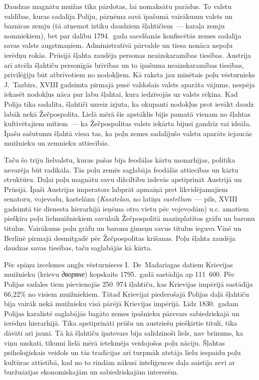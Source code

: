\documentclass[twoside,a5paper,12pt,fleqn,openany]{extbook}
\newcommand{\pltxti}[1]{\textit{\textpolish{#1}}}
\newcommand{\rutxti}[1]{\textit{\textrussian{#1}}}
\newcommand{\latxti}[1]{\textit{\textlatin{#1}}}
\begin{document}
Daudzas magnātu muižas tika pārdotas, lai nomaksātu parādus. To valstu valdības, kuras sadalīja Poliju, pārņēma savā īpašumā vairākumu valsts un baznīcas zemju (tā atņemot iztiku daudziem šļahtičiem~--- karaļa zemju nomniekiem), bet par dalību 1794.~gada sacelšanās konfiscētās zemes sadalīja savas valsts augstmaņiem. Administratīvā pārvalde un tiesa nonāca nepoļu ierēdņu rokās. Prūsijā šļahta zaudēja personas neaizskaramības tiesības. Austrija arī atcēla šļahtiču personīgās brīvības un to īpašuma neaizskaramības tiesības, privilēģiju būt atbrīvotiem no nodokļiem. Kā raksta jau minētais poļu vēsturnieks J.~Tazbirs, XVIII gadsimta pirmajā pusē valdošais valsts aparāta vājums, nespēja iekasēt nodokļus nāca par labu šļahtai, kura iedzīvojās uz valsts rēķina. Kad Polija tika sadalīta, šļahtiči uzreiz izjuta, ka okupanti nodokļus prot ievākt daudz labāk nekā Žečpospolita. Lielā mērā šis apstāklis bijis pamatā vienam no šļahtas kultivētajiem mītiem~--- ka Žečpospolitas valsts iekārta bijusi gandrīz vai ideāla. Īpašu sašutumu šļahtā viesa tas, ka poļu zemes sadalījušo valstu aparāts iejaucās muižnieku un zemnieku attiecībās.

Taču šo triju lielvalstu, kuras pašas bija feodālas kārtu monarhijas, politika nevarēja būt radikāla. Tās poļu zemēs saglabāja feodālās attiecības un kārtu struktūru. Daļai poļu magnātu savu dižciltību izdevās apstiprināt Austrijā un Prūsijā. Īpaši Austrijas imperators labprāt apmaiņā pret likvidējamajiem senatoru, vojevodu, kastelānu (\pltxti{Kasztelan}, no latīņu \latxti{castellum}~--- pils, XVIII gadsimtā tie dienesta hierarhijā ieņēma otro vietu pēc vojevodām) u.c. amatiem piešķīra poļu lielmuižniekiem savulaik Žečpospolitā mazizplatītos grāfu un baronu titulus. Vairākums poļu grāfu un baronu ģimeņu savus titulus ieguva Vīnē un Berlīnē pirmajā desmitgadē pēc Žečpospolitas krišanas. Poļu šļahta zaudēja daudzas savas tiesības, taču saglabājās kā kārta.

Pēc spāņu izcelsmes angļu vēsturnieces I.~De~Madariagas datiem Krievijas muižnieku (krievu \rutxti{дворяне}) kopskaits 1795.~gadā sastādīja ap 111~600. Pēc Polijas sadales tiem pievienojās 250~974 šļahtiču, kas Krievijas impērijā sastādīja 66,22\% no visiem muižniekiem. Tātad Krievijai piederošajā Polijas daļā šļahtiču bija vairāk nekā muižnieku visā pārējā Krievijas impērijā. Līdz 1830.~gadam Polijas karalistē saglabājās bagāto zemes īpašnieku pārsvars sabiedriskajā un ierēdņu hierarhijā. Tika apstiprināti prūšu un austriešu piešķirtie tituli, tika dāvāti arī jauni. Tā kā šļahtiču īpatsvars bija salīdzinoši liels, nav brīnums, ka viņu uzskati, tikumi lielā mērā ietekmēja veidojošos poļu nāciju. Šļahtas psiholoģiskais veidols un tās tradīcijas arī turpmāk atstāja lielu iespaidu poļu kultūras attīstībā, kad no to rindām nākusī inteliģences daļa saistīja sevi ar buržuāzijas ekonomiskajām un sabiedriskajām interesēm.
\end{document}
